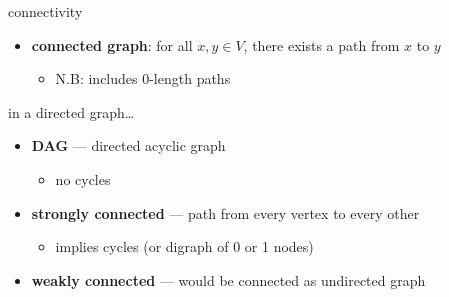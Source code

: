 \begin{frame}{connectivity}
\begin{itemize}
\item \textbf{connected graph}: for all $x, y  \in V$, there exists a path from $x$ to $y$
    \begin{itemize}
    \item N.B: includes 0-length paths
    \end{itemize}
\end{itemize}
\end{frame}

\begin{frame}{in a directed graph\ldots}
\begin{itemize}
\item \textbf{DAG} --- directed acyclic graph
    \begin{itemize}
    \item no cycles
    \end{itemize}
\item \textbf{strongly connected} --- path from every vertex to every other
    \begin{itemize}
    \item implies cycles (or digraph of 0 or 1 nodes)
    \end{itemize}
\item \textbf{weakly connected} --- would be connected as undirected graph
\end{itemize}
\end{frame}
